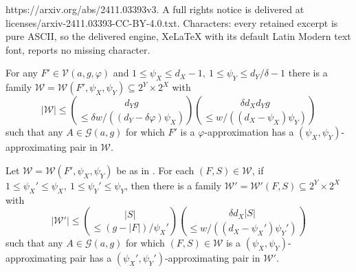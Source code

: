 \documentclass[10pt,a4paper]{amsart}
\newcommand{\beq}[1]{\begin{equation}\label{#1}}
\newcommand{\cG}{\mathcal{G} }
\newcommand{\cV}{\mathcal{V} }
\newcommand{\cW}{\mathcal{W} }
\newcommand{\enq}[0]{\end{equation}}
\newcommand{\sub}[0]{\subseteq}
\begin{document}
https://arxiv.org/abs/2411.03393v3. A full rights notice is delivered at licenses/arxiv-2411.03393-CC-BY-4.0.txt. Characters: every retained excerpt is pure ASCII, so the delivered engine, XeLaTeX with its default Latin Modern text font, reports no missing character.
\begin{lem}\label{lem.psi} For any $F' \in \cV(a,g,\varphi)$ and $1 \le \psi_X \leq d_X-1, \ 1\leq \psi_Y \le d_Y/\delta-1$ there is a family $\cW=\cW(F', \psi_X, \psi_Y) \sub 2^Y \times 2^X$ with
\beq{psi_bd}|\cW|\le {d_Yg \choose \le \delta w/((d_Y-\delta \varphi)\psi_X)}{\delta d_X d_Y g \choose \le w/((d_X-\psi_X)\psi_Y)}\enq
such that any $A \in \cG(a,g)$ for which $F'$ is a $\varphi$-approximation has a $(\psi_X, \psi_Y)$-approximating pair in $\cW.$
\end{lem}

\begin{lem}\label{lem.heart} Let $\cW=\cW(F', \psi_X, \psi_Y)$ be as in .
    For each $(F,S) \in \cW$, if $1 \le \psi_X'\leq \psi_X, \ 1\leq \psi_Y' \le \psi_Y$, then there is a family $\cW'=\cW'(F,S) \sub 2^Y \times 2^X$ with
    \beq{psi'_bd}|\cW'|\le {|S| \choose \le (g-|F|)/\psi_X'}{\delta d_X|S| \choose \le w/((d_X-\psi_X')\psi_Y')}\enq
    such that any $A \in \cG(a,g)$ for which $(F,S)\in \cW$ is a $(\psi_X, \psi_Y)$-approximating pair has a $(\psi_X', \psi_Y')$-approximating pair in $\cW'.$
\end{lem}
\end{document}
